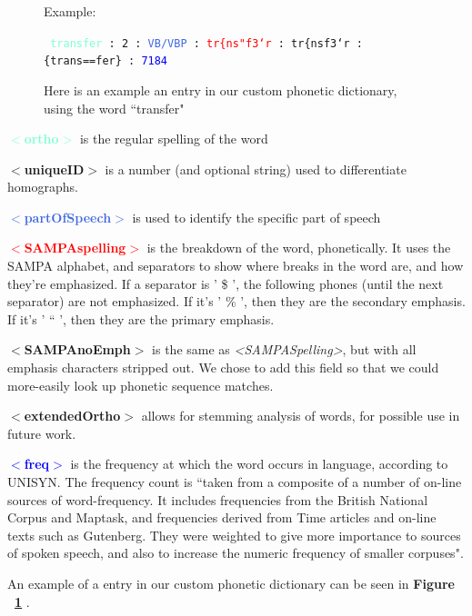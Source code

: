 \begin{figure}
Example:
\begin{center}
{\tt 
\textcolor{Aquamarine}{transfer} :
\textcolor{BurntOrange}{2} :
\textcolor{RoyalBlue}{VB/VBP} :
\textcolor{Red}{tr\{ns"f3`r} :
\textcolor{Rhodamine}{tr\{nsf3`r} :
\textcolor{Periwinkle}{\{trans==fer\}} :
\textcolor{Blue}{7184}
}
\captionfonts
\caption[Custom dictionary entry example]{Here is an example an entry in our custom phonetic dictionary, using the word ``transfer" }
\label{fig:customDictionaryEntryExample}
\end{center}
\end{figure}

\textcolor{Aquamarine}{$<$\textbf{ortho}$>$} is the regular spelling of the word

\textcolor{BurntOrange}{$<$\textbf{uniqueID}$>$} is a number (and optional string) used to differentiate homographs.

\textcolor{RoyalBlue}{$<$\textbf{partOfSpeech}$>$} is used to identify the specific part of speech

\textcolor{Red}{$<$\textbf{SAMPAspelling}$>$} is the breakdown of the word, phonetically. It uses the SAMPA alphabet, and separators to show where breaks in the word are, and how they’re emphasized. If a separator is ' \$ ', the following phones (until the next separator) are not emphasized.  If it's ' \% ', then they are the secondary emphasis.  If it's ' `` ', then they are the primary emphasis.

\textcolor{Rhodamine}{$<$\textbf{SAMPAnoEmph}$>$} is the same as \emph{<SAMPASpelling>}, but with all emphasis characters stripped out.  We chose to add this field so that we could more-easily look up phonetic sequence matches. 

\textcolor{Periwinkle}{$<$\textbf{extendedOrtho}$>$} allows for stemming analysis of words, for possible use in future work.

\textcolor{Blue}{$<$\textbf{freq}$>$} is the frequency at which the word occurs in language, according to UNISYN. The frequency count is ``taken from a composite of a number of on-line sources of word-frequency. It includes frequencies from the British National Corpus and Maptask, and frequencies derived from Time articles and on-line texts such as Gutenberg. They were weighted to give more importance to sources of spoken speech, and also to increase the numeric frequency of smaller corpuses"\cite{fitt_documentation_2000}.


An example of a entry in our custom phonetic dictionary can be seen in \textbf{Figure ~\ref{fig:customDictionaryEntryExample} }.
